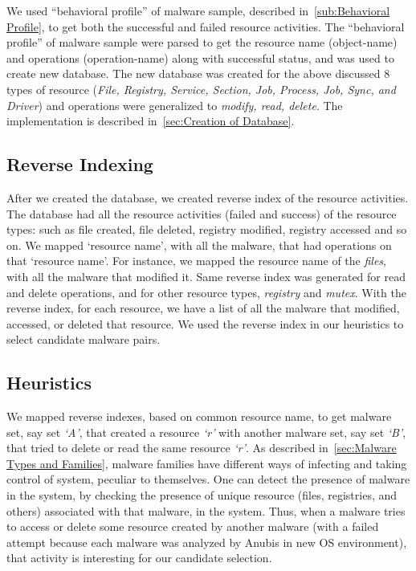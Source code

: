 We used ``behavioral profile'' of malware sample, described in~\autoref{sub:Behavioral Profile}, to get both the successful and failed resource activities.
The ``behavioral profile'' of malware sample were parsed to get the resource name (object-name) and operations (operation-name) along with successful status, and was used to create new database.
The new database was created for the above discussed 8 types of resource (\emph{File, Registry, Service, Section, Job, Process, Job, Sync, and Driver}) and operations were generalized to \emph{modify, read, delete}.
The implementation is described in~\autoref{sec:Creation of Database}.

\subsection{Reverse Indexing}
\label{sub:Reverse Indexing}
After we created the database, we created reverse index of the resource activities.
The database had all the resource activities (failed and success) of the resource types: such as file created, file deleted, registry modified, registry accessed and so on.
We mapped `resource name', with all the malware, that had operations on that `resource name'.
For instance, we mapped the resource name of the \emph{files}, with all the malware that modified it.
Same reverse index was generated for read and delete operations, and for other resource types, \emph{registry} and \emph{mutex}.
With the reverse index, for each resource, we have a list of all the malware that modified, accessed, or deleted that resource.
We used the reverse index in our heuristics to select candidate malware pairs.
\subsection{Heuristics}
\label{sub:Heuristics}
We mapped reverse indexes, based on common resource name, to get malware set, say set \emph{`A'}, that created a resource \emph{`r'} with another malware set, say set \emph{`B'}, that tried to delete or read the same resource \emph{`r'}.
As described in~\autoref{sec:Malware Types and Families}, malware families have different ways of infecting and taking control of system, peculiar to themselves.
One can detect the presence of malware in the system, by checking the presence of unique resource (files, registries, and others) associated with that malware, in the system.
Thus, when a malware tries to access or delete some resource created by another malware (with a failed attempt because each malware was analyzed by Anubis in new OS environment), that activity is interesting for our candidate selection.\\

